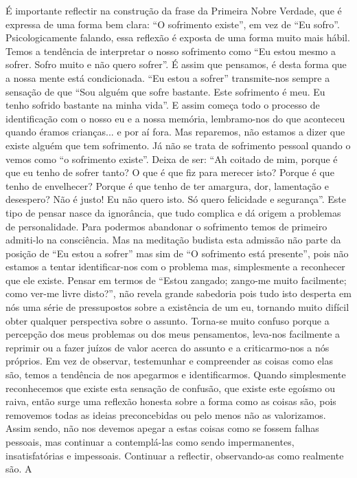 É importante reflectir na construção da frase da Primeira
Nobre Verdade, que é expressa de uma forma bem clara: “O
sofrimento existe”, em vez de “Eu sofro”. Psicologicamente
falando, essa reflexão é exposta de uma forma muito mais
hábil. Temos a tendência de interpretar o nosso sofrimento
como “Eu estou mesmo a sofrer. Sofro muito e não quero
sofrer”. É assim que pensamos, é desta forma que a nossa
mente está condicionada.
“Eu estou a sofrer” transmite-nos sempre a sensação de
que “Sou alguém que sofre bastante. Este sofrimento é meu.
Eu tenho sofrido bastante na minha vida”. E assim começa
todo o processo de identificação com o nosso eu e a nossa
memória, lembramo-nos do que aconteceu quando éramos
crianças... e por aí fora.
Mas reparemos, não estamos a dizer que existe alguém
que tem sofrimento. Já não se trata de sofrimento pessoal
quando o vemos como “o sofrimento existe”. Deixa de ser:
“Ah coitado de mim, porque é que eu tenho de sofrer tanto?
O que é que fiz para merecer isto? Porque é que tenho de
envelhecer? Porque é que tenho de ter amargura, dor,
lamentação e desespero? Não é justo! Eu não quero isto. Só
quero felicidade e segurança”.
Este tipo de pensar nasce da ignorância, que tudo complica e dá origem a problemas de personalidade.
Para podermos abandonar o sofrimento temos de
primeiro admiti-lo na consciência. Mas na meditação budista
esta admissão não parte da posição de “Eu estou a sofrer” mas
sim de “O sofrimento está presente”, pois não estamos a tentar
identificar-nos com o problema mas, simplesmente a reconhecer que ele existe. Pensar em termos de “Estou zangado;
zango-me muito facilmente; como ver-me livre disto?”, não
revela grande sabedoria pois tudo isto desperta em nós uma
série de pressupostos sobre a existência de um eu, tornando
muito difícil obter qualquer perspectiva sobre o assunto.
Torna-se muito confuso porque a percepção dos meus problemas ou dos meus pensamentos, leva-nos facilmente a reprimir
ou a fazer juízos de valor acerca do assunto e a criticarmo-nos
a nós próprios. Em vez de observar, testemunhar e compreender
as coisas como elas são, temos a tendência de nos apegarmos
e identificarmos. Quando simplesmente reconhecemos que
existe esta sensação de confusão, que existe este egoísmo ou
raiva, então surge uma reflexão honesta sobre a forma como
as coisas são, pois removemos todas as ideias preconcebidas
ou pelo menos não as valorizamos.
Assim sendo, não nos devemos apegar a estas coisas
como se fossem falhas pessoais, mas continuar a contemplá-las
como sendo impermanentes, insatisfatórias e impessoais.
Continuar a reflectir, observando-as como realmente são. A
